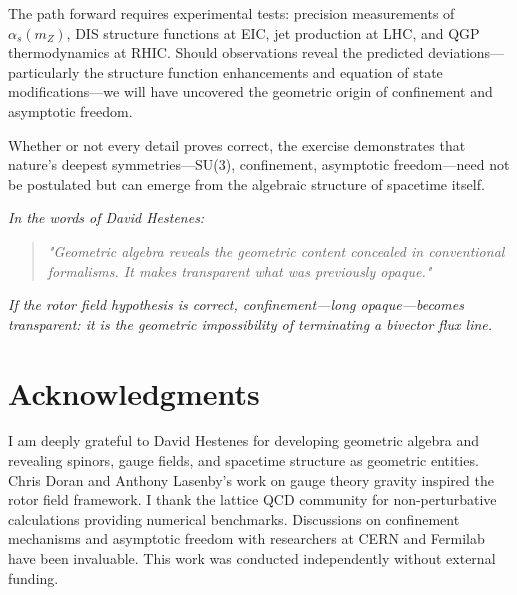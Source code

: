 \documentclass[11pt,a4paper]{article}
\theoremstyle{definition}
\theoremstyle{plain}
\theoremstyle{remark}
\begin{document}
The path forward requires experimental tests: precision measurements of $\alpha_s(m_Z)$, DIS structure functions at EIC, jet production at LHC, and QGP thermodynamics at RHIC. Should observations reveal the predicted deviations---particularly the structure function enhancements and equation of state modifications---we will have uncovered the geometric origin of confinement and asymptotic freedom.

Whether or not every detail proves correct, the exercise demonstrates that nature's deepest symmetries---SU(3), confinement, asymptotic freedom---need not be postulated but can emerge from the algebraic structure of spacetime itself.

\vspace{1em}

\noindent\textit{In the words of David Hestenes:}

\begin{quote}
\textit{"Geometric algebra reveals the geometric content concealed in conventional formalisms. It makes transparent what was previously opaque."}
\end{quote}

\vspace{1em}

\noindent\textit{If the rotor field hypothesis is correct, confinement---long opaque---becomes transparent: it is the geometric impossibility of terminating a bivector flux line.}

\vspace{1em}

\section*{Acknowledgments}

I am deeply grateful to David Hestenes for developing geometric algebra and revealing spinors, gauge fields, and spacetime structure as geometric entities. Chris Doran and Anthony Lasenby's work on gauge theory gravity inspired the rotor field framework. I thank the lattice QCD community for non-perturbative calculations providing numerical benchmarks. Discussions on confinement mechanisms and asymptotic freedom with researchers at CERN and Fermilab have been invaluable. This work was conducted independently without external funding.

\vspace{1em}
\end{document}
